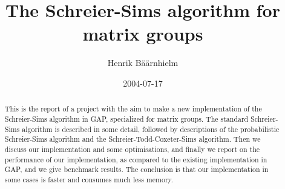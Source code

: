 \documentclass[twoside]{amsbook}
\numberwithin{equation}{section}
\numberwithin{figure}{chapter}
\newcounter{algorithm}[chapter]
\theoremstyle{plain}
\theoremstyle{definition}
\theoremstyle{remark}
\newcommand{\GAP}{\textsf{GAP}}
\begin{document}
\frontmatter

\title{The Schreier-Sims algorithm for matrix groups}
\author{Henrik B\"a\"arnhielm}
\date{2004-07-17}



\begin{abstract}
  This is the report of a project with the aim to make a new
  implementation of the Schreier-Sims algorithm in \GAP, specialized
  for matrix groups. The standard Schreier-Sims algorithm is
  described in some detail, followed by descriptions of the probabilistic
  Schreier-Sims algorithm and the Schreier-Todd-Coxeter-Sims
  algorithm. Then we discuss our implementation and some
  optimisations, and finally we report on the performance of our
  implementation, as compared to the existing implementation in \GAP,
  and we give benchmark results. The conclusion is that our
  implementation in some cases is faster and consumes much less memory.
\end{abstract}


\maketitle



\tableofcontents




\mainmatter















%

\appendix



\backmatter



\end{document}
